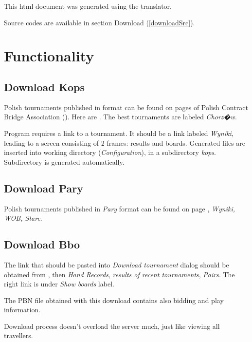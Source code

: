 \documentclass[polish,a4paper,11pt,oneside]{article}
\begin{document}
This html document was generated using the
 translator.

Source codes are available in section Download (\ref{downloadSrc}).

\section{Functionality}
\subsection{Download Kops} \label{pobKops}

Polish tournaments published in 
format can be found on pages of Polish Contract Bridge Association
().
Here are .
The best tournaments are labeled {\em Chorz�w}.

Program requires a link to a tournament.
It should be a link labeled {\em Wyniki},
leading to a screen consisting of 2 frames: results and boards.
Generated files are inserted into working directory ({\em Configuration}),
in a subdirectory {\em kops}. Subdirectory is generated automatically.

\subsection{Download Pary} \label{pobPary}

Polish tournaments published in {\em Pary}
format can be found on page
,
{\em Wyniki, WOB, Stare}.

\subsection{Download Bbo} \label{pobBbo}
The link that should be pasted into {\em Download tournament} dialog
should be obtained from \bbolonglink, then {\em Hand Records}, 
{\em results of recent tournaments}, {\em Pairs}.
The right link is under {\em Show boards} label.

The PBN file obtained with this download contains also bidding and play
information.

Download process doesn't overload the server much, just like viewing
all travellers.
\end{document}
